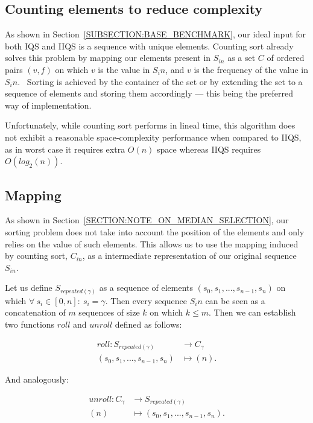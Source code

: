 \subsection{Counting elements to reduce complexity}
As shown in Section~\ref{SUBSECTION:BASE_BENCHMARK}, our ideal input for both IQS and IIQS is a sequence with unique elements. Counting sort already solves this problem by mapping our elements present in $S_{in}$ as a set $C$ of ordered pairs $(v,f)$ on which $v$ is the value in $S_in$, and $v$ is the frequency of the value in $S_in$.~\cite{10.5555/280635} Sorting is achieved by the container of the set or by extending the set to a sequence of elements and storing them accordingly --- this being the preferred way of implementation. 

Unfortunately, while counting sort performs in lineal time, this algorithm does not exhibit a reasonable space-complexity performance when compared to IIQS, as in worst case it requires extra $O(n)$ space whereas IIQS requires $O(log_2(n))$.

\subsection{Mapping}
\label{SECTION:MAPPING}
As shown in Section~\ref{SECTION:NOTE_ON_MEDIAN_SELECTION}, our sorting problem does not take into account the position of the elements and only relies on the value of such elements. This allows us to use the mapping induced by counting sort, $C_{in}$, as a intermediate representation of our original sequence $S_{in}$.

Let us define $S_{repeated(\gamma)}$ as a sequence of elements $(s_0, s_1,...,s_{n-1},s_{n})$ on which $\forall ~s_i \in [0,n]:~s_i = \gamma$. Then every sequence $S_in$ can be seen as a concatenation of $m$ sequences of size $k$ on which $k \leq m$. Then we can establish two functions $roll$ and $unroll$ defined as follows:

\begin{align*}
    roll \colon S_{repeated(\gamma)} &\to C_{\gamma}\\
    (s_0, s_1,...,s_{n-1},s_{n})  &\mapsto (n).
\end{align*}

And analogously:

\begin{align*}
    unroll \colon C_{\gamma} &\to S_{repeated(\gamma)}\\
    (n) &\mapsto (s_0, s_1,...,s_{n-1},s_{n}).
\end{align*}


